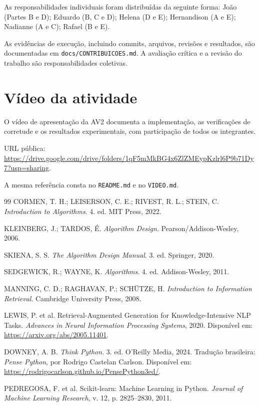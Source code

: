 \documentclass[11pt,a4paper]{article}
\theoremstyle{plain}
\theoremstyle{definition}
\theoremstyle{plain}
\begin{document}
As responsabilidades individuais foram
distribuídas da seguinte forma:
João (Partes B e D); Eduardo (B, C e D);
Helena (D e E); Hernandison (A e E);
Nadianne (A e C); Rafael (B e E).

As evidências de execução, incluindo
commits, arquivos, revisões e resultados,
são documentadas em
\texttt{docs/CONTRIBUICOES.md}.
A avaliação crítica e a revisão do
trabalho são responsabilidades coletivas.


\section{Vídeo da atividade}

O vídeo de apresentação da AV2 documenta
a implementação, as verificações de corretude
e os resultados experimentais, com participação
de todos os integrantes.

URL pública:
\url{https://drive.google.com/drive/folders/1qF5mMkBG4x6ZlZMEypKzlrl6P9b71Dy7?usp=sharing}.

A mesma referência consta no \texttt{README.md}
e no \texttt{VIDEO.md}.


\begin{thebibliography}{99}
CORMEN, T. H.; LEISERSON, C. E.; RIVEST, R. L.; STEIN, C.
\emph{Introduction to Algorithms}. 4. ed. MIT Press, 2022.

KLEINBERG, J.; TARDOS, É. \emph{Algorithm Design}.
Pearson/Addison-Wesley, 2006.

SKIENA, S. S. \emph{The Algorithm Design Manual}. 3. ed. Springer, 2020.

SEDGEWICK, R.; WAYNE, K. \emph{Algorithms}. 4. ed. Addison-Wesley, 2011.

MANNING, C. D.; RAGHAVAN, P.; SCHÜTZE, H.
\emph{Introduction to Information Retrieval}.
Cambridge University Press, 2008.

LEWIS, P. et al. Retrieval-Augmented Generation for Knowledge-Intensive NLP Tasks.
\emph{Advances in Neural Information Processing Systems}, 2020.
Disponível em: \url{https://arxiv.org/abs/2005.11401}.

DOWNEY, A. B. \emph{Think Python}. 3. ed. O'Reilly Media, 2024.
Tradução brasileira: \emph{Pense Python}, por Rodrigo Castelan Carlson.
Disponível em: \url{https://rodrigocarlson.github.io/PensePython3ed/}.

PEDREGOSA, F. et al. Scikit-learn: Machine Learning in Python.
\emph{Journal of Machine Learning Research}, v. 12, p. 2825--2830, 2011.
\end{thebibliography}
\end{document}
